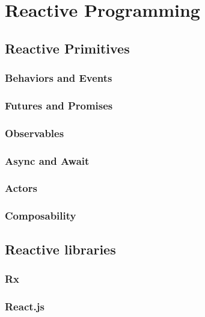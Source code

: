 \chapter{Reactive Programming}

\section{Reactive Primitives}

\subsection{Behaviors and Events}

\subsection{Futures and Promises}

\subsection{Observables}

\subsection{Async and Await}

\subsection{Actors}

\subsection{Composability}

\section{Reactive libraries}

\subsection{Rx}

\subsection{React.js}